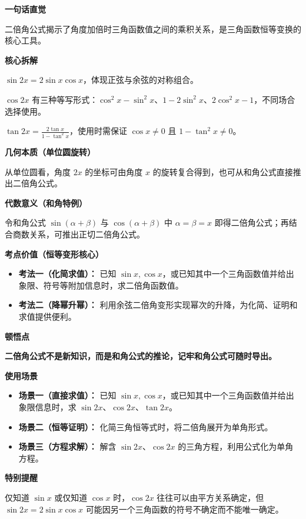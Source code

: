 \begin{explanationbox}

	\textbf{\textcolor{CExplanation}{一句话直觉}}

	二倍角公式揭示了角度加倍时三角函数值之间的乘积关系，是三角函数恒等变换的核心工具。

	\medskip
	\textbf{\textcolor{CExplanation}{核心拆解}}
	\begin{description}[style=nextline, leftmargin=2.8em, labelsep=0.5em, itemsep=0.45em]
		\item[\textbf{要点一（正弦余弦乘积）：}] $\sin 2x = 2\sin x \cos x$，体现正弦与余弦的对称组合。
		\item[\textbf{要点二（余弦等价形式）：}] $\cos 2x$ 有三种等写形式：$\cos^2 x - \sin^2 x$、$1-2\sin^2 x$、$2\cos^2 x-1$，不同场合选择使用。
		\item[\textbf{要点三（正切分式结构）：}] $\tan 2x = \frac{2\tan x}{1-\tan^2 x}$，使用时需保证 $\cos x\ne0$ 且 $1-\tan^2x\ne0$。
	\end{description}

	\medskip
	\textbf{\textcolor{CExplanation}{几何本质（单位圆旋转）}}

	从单位圆看，角度 $2x$ 的坐标可由角度 $x$ 的旋转复合得到，也可从和角公式直接推出二倍角公式。

	\medskip
	\textbf{\textcolor{CExplanation}{代数意义（和角特例）}}

	令和角公式 $\sin(\alpha+\beta)$ 与 $\cos(\alpha+\beta)$ 中 $\alpha=\beta=x$ 即得二倍角公式；再结合商数关系，可推出正切二倍角公式。

	\medskip
	\textbf{\textcolor{CExplanation}{考点价值（恒等变形核心）}}
	\begin{itemize}[leftmargin=*, itemsep=0.5em, topsep=0.4em]
		\item \textbf{考法一（化简求值）：} 已知 $\sin x,\cos x$，或已知其中一个三角函数值并给出象限、符号等附加信息时，求二倍角函数值。
		\item \textbf{考法二（降幂升幂）：} 利用余弦二倍角变形实现幂次的升降，为化简、证明和求值提供便利。
	\end{itemize}

	\medskip
	\textbf{\textcolor{CExplanation}{顿悟点}}

	\textbf{二倍角公式不是新知识，而是和角公式的推论，记牢和角公式可随时导出。}

	\medskip
	\textbf{\textcolor{CExplanation}{使用场景}}
	\begin{itemize}[leftmargin=*, itemsep=0.5em, topsep=0.4em]
		\item \textbf{场景一（直接求值）：} 已知 $\sin x,\cos x$，或已知其中一个三角函数值并给出象限信息时，求 $\sin 2x$、$\cos 2x$、$\tan 2x$。
		\item \textbf{场景二（恒等证明）：} 化简三角恒等式时，将二倍角展开为单角形式。
		\item \textbf{场景三（方程求解）：} 解含 $\sin 2x$、$\cos 2x$ 的三角方程，利用公式化为单角方程。
	\end{itemize}

	\medskip
	\textbf{\textcolor{CExplanation}{特别提醒}}

	仅知道 $\sin x$ 或仅知道 $\cos x$ 时，$\cos 2x$ 往往可以由平方关系确定，但 $\sin 2x=2\sin x\cos x$ 可能因另一个三角函数的符号不确定而不能唯一确定。

\end{explanationbox}